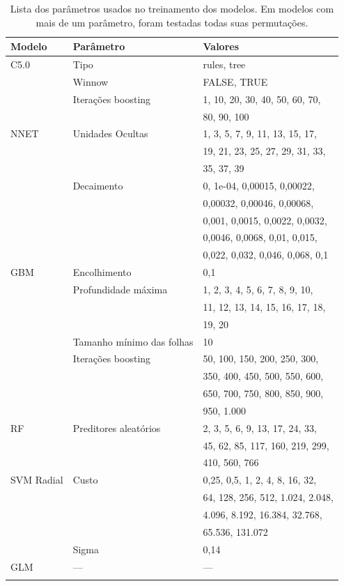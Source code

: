 \documentclass[a4paper,titlepage]{ppgi}\usepackage[]{graphicx}\usepackage[]{color}
\begin{document}
\begin{longtable}{l l l}
\centering
  Modelo & Parâmetro & Valores \\
  \hline
  C5.0 & Tipo & rules, tree \\
   & Winnow & FALSE, TRUE \\
   & Iterações boosting & 1, 10, 20, 30, 40, 50, 60, 70, \\
 &  & 80, 90, 100 \\
  NNET & Unidades Ocultas & 1, 3, 5, 7, 9, 11, 13, 15, 17, \\
 &  & 19, 21, 23, 25, 27, 29, 31, 33, \\
 &  & 35, 37, 39 \\
   & Decaimento & 0, 1e-04, 0,00015, 0,00022, \\
 &  & 0,00032, 0,00046, 0,00068, \\
 &  & 0,001, 0,0015, 0,0022, 0,0032, \\
 &  & 0,0046, 0,0068, 0,01, 0,015, \\
 &  & 0,022, 0,032, 0,046, 0,068, 0,1 \\
  GBM & Encolhimento & 0,1 \\
   & Profundidade máxima & 1, 2, 3, 4, 5, 6, 7, 8, 9, 10, \\
 &  & 11, 12, 13, 14, 15, 16, 17, 18, \\
 &  & 19, 20 \\
   & Tamanho mínimo das folhas & 10 \\
   & Iterações boosting & 50, 100, 150, 200, 250, 300, \\
 &  & 350, 400, 450, 500, 550, 600, \\
 &  & 650, 700, 750, 800, 850, 900, \\
 &  & 950, 1.000 \\
  RF & Preditores aleatórios & 2, 3, 5, 6, 9, 13, 17, 24, 33, \\
 &  & 45, 62, 85, 117, 160, 219, 299, \\
 &  & 410, 560, 766 \\
  SVM Radial & Custo & 0,25, 0,5, 1, 2, 4, 8, 16, 32, \\
 &  & 64, 128, 256, 512, 1.024, 2.048, \\
 &  & 4.096, 8.192, 16.384, 32.768, \\
 &  & 65.536, 131.072 \\
   & Sigma & 0,14 \\
  GLM & --- & --- \\
\caption{Lista dos parâmetros usados no treinamento dos modelos. Em modelos com
mais de um parâmetro, foram testadas todas suas permutações.}
\end{longtable}
\end{document}

